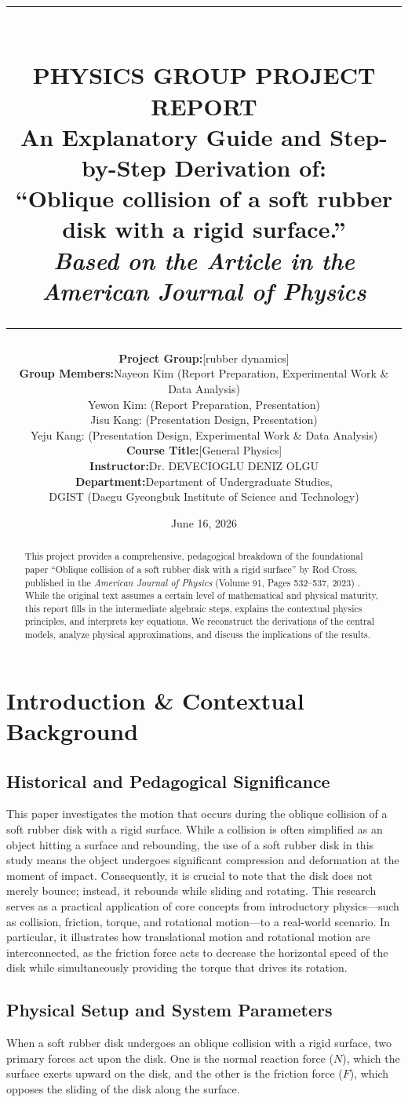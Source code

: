 \documentclass[11pt,letterpaper]{article}
\title{
\vspace{-1.5in}
\rule{\linewidth}{1.5pt} \\ \vspace{4mm}
\large\textbf{PHYSICS GROUP PROJECT REPORT} \\ \vspace{2mm}
\Large\textbf{An Explanatory Guide and Step-by-Step
Derivation of: \\ ``Oblique collision of a soft rubber disk with a rigid surface.''}
\\ \vspace{4mm}
\large\textit{Based on the Article in the American Journal of
Physics} \\
\rule{\linewidth}{1.5pt}
}
\author{
\begin{tabular}{r @{\quad} l}
\textbf{Project Group:} & [rubber dynamics] \\[1ex]
\textbf{Group Members:} & Nayeon Kim (Report Preparation, Experimental Work \& Data Analysis) \\
& Yewon Kim: (Report Preparation, Presentation) \\
& Jisu Kang: (Presentation Design, Presentation) \\
& Yeju Kang: (Presentation Design, Experimental Work \& Data Analysis) \\[1ex]
\textbf{Course Title:}  & [General Physics] \\
\textbf{Instructor:}    & Dr. DEVECIOGLU DENIZ OLGU \\
\textbf{Department:}    & Department of Undergraduate Studies, \\
                        & DGIST (Daegu Gyeongbuk Institute of Science and Technology)
\end{tabular}
}
\date{June 16, 2026}
\begin{document}
\maketitle
\begin{abstract}
This project provides a comprehensive, pedagogical breakdown of the foundational paper ``Oblique collision of a soft rubber disk with a rigid surface'' by Rod Cross, published in the \textit{American Journal of Physics} (Volume 91, Pages 532--537, 2023) \cite{originalpaper}. While the original text assumes a certain level of mathematical and physical maturity, this report fills in the intermediate algebraic steps, explains the contextual physics principles, and interprets key equations. We reconstruct the derivations of the central models, analyze physical approximations, and discuss the implications of the results.
\end{abstract}
\tableofcontents
\section{Introduction \& Contextual Background}
\subsection{Historical and Pedagogical Significance}
This paper investigates the motion that occurs during the oblique collision of a soft rubber disk with a rigid surface.
While a collision is often simplified as an object hitting a surface and rebounding, the use of a soft rubber disk in this study means the object undergoes significant compression and deformation at the moment of impact.
Consequently, it is crucial to note that the disk does not merely bounce; instead, it rebounds while sliding and rotating.
This research serves as a practical application of core concepts from introductory physics---such as collision, friction, torque, and rotational motion---to a real-world scenario.
In particular, it illustrates how translational motion and rotational motion are interconnected, as the friction force acts to decrease the horizontal speed of the disk while simultaneously providing the torque that drives its rotation.
\subsection{Physical Setup and System Parameters}
When a soft rubber disk undergoes an oblique collision with a rigid surface, two primary forces act upon the disk. One is the normal reaction force ($N$), which the surface exerts upward on the disk, and the other is the friction force ($F$), which opposes the sliding of the disk along the surface.
\end{document}
